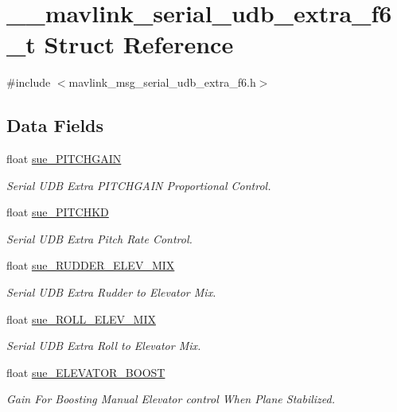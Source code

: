 \hypertarget{struct____mavlink__serial__udb__extra__f6__t}{\section{\+\_\+\+\_\+mavlink\+\_\+serial\+\_\+udb\+\_\+extra\+\_\+f6\+\_\+t Struct Reference}
\label{struct____mavlink__serial__udb__extra__f6__t}
}


{\ttfamily \#include $<$mavlink\+\_\+msg\+\_\+serial\+\_\+udb\+\_\+extra\+\_\+f6.\+h$>$}

\subsection*{Data Fields}
\begin{DoxyCompactItemize}
\item 
float \hyperlink{struct____mavlink__serial__udb__extra__f6__t_ac960ec18058f023d0d9a8e9d58272d4c}{sue\+\_\+\+P\+I\+T\+C\+H\+G\+A\+I\+N}
\begin{DoxyCompactList}\small\item\em Serial U\+D\+B Extra P\+I\+T\+C\+H\+G\+A\+I\+N Proportional Control. \end{DoxyCompactList}\item 
float \hyperlink{struct____mavlink__serial__udb__extra__f6__t_a5aed971a70ff5153a795f9638dcb478a}{sue\+\_\+\+P\+I\+T\+C\+H\+K\+D}
\begin{DoxyCompactList}\small\item\em Serial U\+D\+B Extra Pitch Rate Control. \end{DoxyCompactList}\item 
float \hyperlink{struct____mavlink__serial__udb__extra__f6__t_ab8552b3ff29bf892e3c5a708130686ba}{sue\+\_\+\+R\+U\+D\+D\+E\+R\+\_\+\+E\+L\+E\+V\+\_\+\+M\+I\+X}
\begin{DoxyCompactList}\small\item\em Serial U\+D\+B Extra Rudder to Elevator Mix. \end{DoxyCompactList}\item 
float \hyperlink{struct____mavlink__serial__udb__extra__f6__t_a49fabffffcb659643b8a53d0975e58ec}{sue\+\_\+\+R\+O\+L\+L\+\_\+\+E\+L\+E\+V\+\_\+\+M\+I\+X}
\begin{DoxyCompactList}\small\item\em Serial U\+D\+B Extra Roll to Elevator Mix. \end{DoxyCompactList}\item 
float \hyperlink{struct____mavlink__serial__udb__extra__f6__t_a2ead52fc52497fa23f774bed8bab5a1b}{sue\+\_\+\+E\+L\+E\+V\+A\+T\+O\+R\+\_\+\+B\+O\+O\+S\+T}
\begin{DoxyCompactList}\small\item\em Gain For Boosting Manual Elevator control When Plane Stabilized. \end{DoxyCompactList}\end{DoxyCompactItemize}


